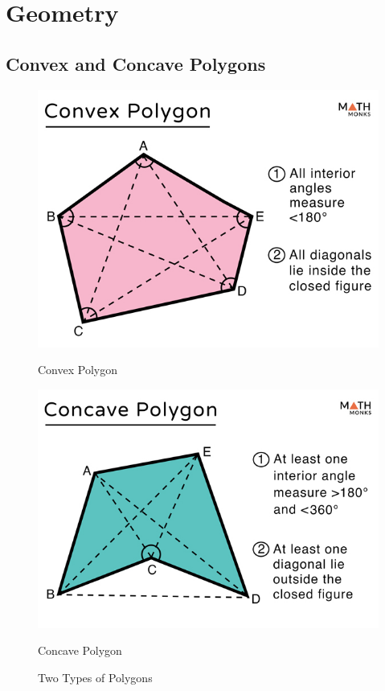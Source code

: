 \section{Geometry}


\subsection{Convex and Concave Polygons}


\begin{figure}[h]
    \centering
    \begin{minipage}[b]{0.25\textwidth}
        \centering
        \includegraphics[width=\linewidth]{media/Convex-Polygon.jpg}
        \caption{Convex Polygon}
    \end{minipage}%
    \begin{minipage}[b]{0.25\textwidth}
        \centering
        \includegraphics[width=\linewidth]{media/Concave-Polygon.jpg}
        \caption{Concave Polygon}
    \end{minipage}
    \caption{Two Types of Polygons}
\end{figure}

